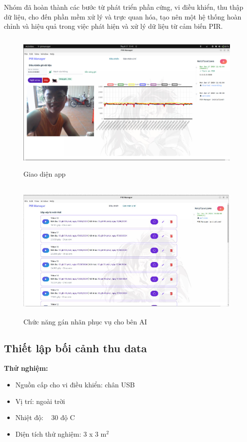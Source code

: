 \documentclass{article}
\begin{document}
Nhóm đã hoàn thành các bước từ phát triển phần cứng, vi điều khiển, thu thập dữ liệu, cho đến phần mềm xử lý và trực quan hóa, tạo nên một hệ thống hoàn chỉnh và hiệu quả trong việc phát hiện và xử lý dữ liệu từ cảm biến PIR.
\begin{figure}[H]
    \centering
    \includegraphics[width=12cm,height=7cm]{image/anh11.png}
    \caption{Giao diện app} \label{EV}
\end{figure}
\begin{figure}[H]
    \centering
    \includegraphics[width=12cm,height=7cm]{image/anh12.png}
    \caption{Chức năng gán nhãn phục vụ cho bên AI} \label{EV}
\end{figure}

\subsection{Thiết lập bối cảnh thu data}
\textbf{Thử nghiệm:}
\begin{itemize}
    \item Nguồn cấp cho vi điều khiển: chân USB
    \item Vị trí: ngoài trời
    \item Nhiệt độ: ~ 30 độ C
    \item Diện tích thử nghiệm: 3 x 3 m\(^2\)
\end{itemize}
\end{document}
